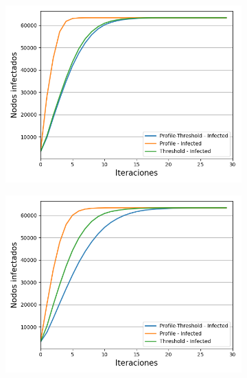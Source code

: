 \documentclass{article}
\begin{document}
\begin{figure}[!tbp]
	\begin{subfigure}[b]{0.5\textwidth}
		\includegraphics[width=\textwidth]{../Images/Fig 3 a).png}
		\caption{}
		\label{fig:f31}
	\end{subfigure}
	\hfill
	\begin{subfigure}[b]{0.5\textwidth}
		\includegraphics[width=\textwidth]{../Images/Fig 3 b).png}
		\caption{}
		\label{fig:f32}
	\end{subfigure}
	\begin{subfigure}[b]{0.5\textwidth}

\end{subfigure}
\end{figure}
\end{document}
